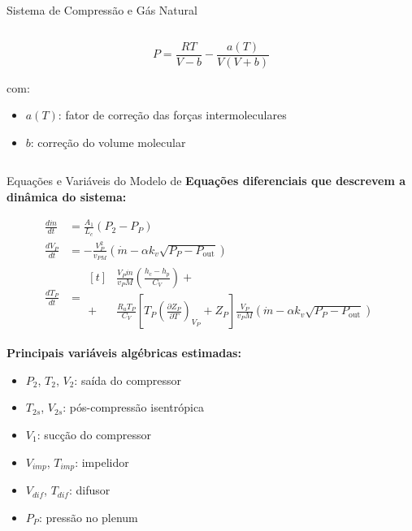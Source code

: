 \begin{frame}{Sistema de Compressão e Gás Natural}
\begin{columns}[T]
\begin{column}{0.52\textwidth}
            \[
            P = \frac{R T}{V - b} - \frac{a(T)}{V(V + b)}
            \]

            com:
            \begin{itemize}
                \item \( a(T) \): fator de correção das forças intermoleculares
                \item \( b \): correção do volume molecular
            \end{itemize}
        \end{column}
    \end{columns}
\end{frame}



\begin{frame}{Equações e Variáveis do Modelo de \cite{Meira2022}}
    \scriptsize
    \textbf{Equações diferenciais que descrevem a dinâmica do sistema:}

    \begin{multicols}{2}
    \begin{align}
        \frac{d\dot{m}}{dt} &= \frac{A_1}{L_c}(P_2 - P_P) \tag{1} \\
        \frac{dV_P}{dt} &= -\frac{V_P^2}{v_{PM}} \left( \dot{m} - \alpha k_v \sqrt{P_P - P_{\text{out}}} \right) \tag{2} \\
        \frac{dT_P}{dt} &= 
        \begin{aligned}[t]
            &\frac{V_P \dot{m}}{v_P M} \left( \frac{h_c - h_p}{C_V} \right) + \\
            + &\frac{R_a T_P}{C_V} \left[ T_P \left( \frac{\partial Z_P}{\partial T} \right)_{V_P} + Z_P \right]
            \frac{V_P}{v_P M} \left( \dot{m} - \alpha k_v \sqrt{P_P - P_{\text{out}}} \right)
        \end{aligned} \tag{3}
    \end{align}

    \columnbreak
    \begin{minipage}{\linewidth}
        \raggedleft
        \textbf{Principais variáveis algébricas estimadas:}
        \begin{itemize}
            \item \( P_2 \), \( T_2 \), \( V_2 \): saída do compressor
            \item \( T_{2s} \), \( V_{2s} \): pós-compressão isentrópica
            \item \( V_1 \): sucção do compressor
            \item \( V_{imp} \), \( T_{imp} \): impelidor
            \item \( V_{dif} \), \( T_{dif} \): difusor
            \item \( P_P \): pressão no plenum
        \end{itemize}
    \end{minipage}
    \end{multicols}


\end{frame}
